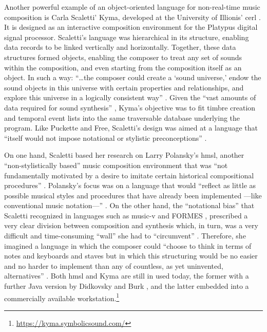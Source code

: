 \documentclass[
]{book}
\begin{document}
Another powerful example of an object-oriented language for non-real-time music composition is Carla Scaletti' Kyma, developed at the University of Illionis' \gls{cerl} \parencite{DBLP:conf/icmc/Scaletti87}. It is designed as an interactive composition environment for the Platypus digital signal processor. Scaletti's language was hierarchical in its structure, enabling data records to be linked vertically and horizontally. Together, these data structures formed objects, enabling the composer to treat any set of sounds within the composition, and even starting from the composition itself as an object. In such a way: ``\dots the composer could create a `sound universe,' endow the sound objects in this universe with certain properties and relationships, and explore this universe in a logically consistent way'' \parencite[50]{DBLP:conf/icmc/Scaletti87}. Given the ``vast amounts of data required for sound synthesis'' \parencite[50]{DBLP:conf/icmc/Scaletti87}, Kyma's objective was to fit timbre creation and temporal event lists into the same traversable database underlying the program. Like Puckette and Free, Scaletti's design was aimed at a language that ``itself would not impose notational or stylistic preconceptions'' \parencite[50]{DBLP:conf/icmc/Scaletti87}.

On one hand, Scaletti based her research on Larry Polansky's \gls{hmsl}, another ``non-stylistically based'' music composition environment that was ``not fundamentally motivated by a desire to imitate certain historical compositional procedures'' \parencite[224]{DBLP:conf/icmc/RosenboomP85}. Polansky's focus was on a language that would ``reflect as little as possible musical styles and procedures that have already been implemented ---like conventional music notation---'' \parencite[224]{DBLP:conf/icmc/RosenboomP85}. On the other hand, the ``notational bias'' \parencite[49]{DBLP:conf/icmc/Scaletti87} that Scaletti recognized in languages such as \gls{music-v} and FORMES \parencites{DBLP:conf/icmc/RodetBCP82}{DBLP:conf/icmc/BoyntonDPR86}, prescribed a very clear division between composition and synthesis which, in turn, was a very difficult and time-consuming ``wall'' she had to ``circumvent'' \parencite[49]{DBLP:conf/icmc/Scaletti87}. Therefore, she imagined a language in which the composer could ``choose to think in terms of notes and keyboards and staves but in which this structuring would be no easier and no harder to implement than any of countless, as yet uninvented, alternatives'' \parencite[49]{DBLP:conf/icmc/Scaletti87}. Both \gls{hmsl} and Kyma are still in used today, the former with a further Java version by Didkovsky and Burk \parencite{DBLP:conf/icmc/DidkovskyB01}, and the latter embedded into a commercially available workstation.\footnote{\url{https://kyma.symbolicsound.com/}}
\end{document}
